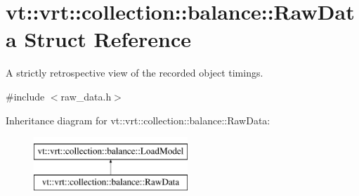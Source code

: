 \hypertarget{structvt_1_1vrt_1_1collection_1_1balance_1_1_raw_data}{}\section{vt\+:\+:vrt\+:\+:collection\+:\+:balance\+:\+:Raw\+Data Struct Reference}
\label{structvt_1_1vrt_1_1collection_1_1balance_1_1_raw_data}


A strictly retrospective view of the recorded object timings.  




{\ttfamily \#include $<$raw\+\_\+data.\+h$>$}

Inheritance diagram for vt\+:\+:vrt\+:\+:collection\+:\+:balance\+:\+:Raw\+Data\+:\begin{figure}[H]
\begin{center}
\leavevmode
\includegraphics[height=2.000000cm]{structvt_1_1vrt_1_1collection_1_1balance_1_1_raw_data}
\end{center}
\end{figure}
